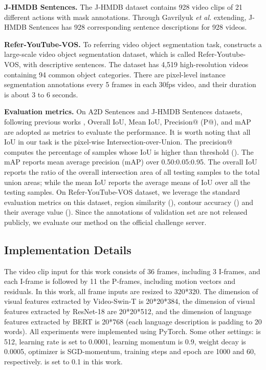\documentclass[sigconf]{acmart}
\begin{document}
{\textbf{J-HMDB Sentences.}} The J-HMDB dataset contains 928 video clips of 21 different actions with mask annotations. Through Gavrilyuk \textit{et al.} \cite{gavrilyuk2018actor} extending, J-HMDB Sentences has 928 corresponding sentence descriptions for 928 videos. 

{\textbf{Refer-YouTube-VOS.}} To referring video object segmentation task, \cite{seo2020urvos} constructs a large-scale video object segmentation dataset, which is called Refer-Youtube-VOS, with descriptive sentences. The dataset has 4,519 high-resolution videos containing 94 common object categories. There are pixel-level instance segmentation annotations every 5 frames in each 30fps video, and their duration is about 3 to 6 seconds. 

{\textbf{Evaluation metrics.}} On A2D Sentences and J-HMDB Sentences datasets, following previous works \cite{gavrilyuk2018actor, wang2019asymmetric, wang2020context, mcintosh2020visual, ning2020polar, hui2021collaborative, ye2021referring, liu2021cross, chen2021cascade}, Overall IoU, Mean IoU, Precision@ (P@), and mAP are adopted as metrics to evaluate the performance. It is worth noting that all IoU in our task is the pixel-wise Intersection-over-Union. The precision@ computes the percentage of samples whose IoU is higher than threshold  (). The mAP reports mean average precision (mAP) over 0.50:0.05:0.95. The overall IoU reports the ratio of the overall intersection area of all testing samples to the total union areas; while the mean IoU reports the average means of IoU over all the testing samples. On Refer-YouTube-VOS dataset, we leverage the standard evaluation metrics on this dataset, region similarity (), contour accuracy () and their average value (). Since the annotations of validation set are not released publicly, we evaluate our method on the official challenge server.



\subsection{Implementation Details}\label{ImpleDets}

The video clip input for this work consists of 36 frames, including 3 I-frames, and each I-frame is followed by 11 the P-frames, including motion vectors and residuals. In this work, all frame inputs are resized to 320*320. The dimension of visual features extracted by Video-Swin-T is 20*20*384, the dimension of visual features extracted by ResNet-18 are 20*20*512, and the dimension of language features extracted by BERT is 20*768 (each language description is padding to 20 words). All experiments were implemented using PyTorch. Some other settings:  is 512, learning rate is set to 0.0001, learning momentum is 0.9, weight decay is 0.0005, optimizer is SGD-momentum, training steps and epoch are 1000 and 60, respectively.  is set to 0.1 in this work.
\end{document}
